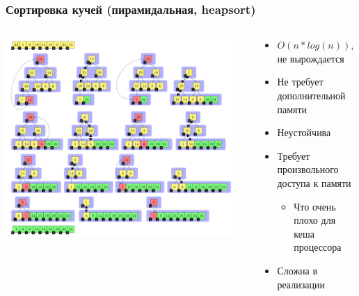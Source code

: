 \documentclass{../../slides-style}
\begin{document}
    \begin{frame}
        \frametitle{Сортировка кучей (пирамидальная, heapsort)}
        \begin{columns}
            \begin{column}{0.6\textwidth}
                \includegraphics[width=0.95\textwidth]{heapsort.png}
            \end{column}
            \begin{column}{0.4\textwidth}
                \begin{itemize}
                    \item $O(n * log(n))$, не вырождается
                    \item Не требует дополнительной памяти
                    \item Неустойчива
                    \item Требует произвольного доступа к памяти
                    \begin{itemize}
                        \item Что очень плохо для кеша процессора
                    \end{itemize}
                    \item Сложна в реализации
                \end{itemize}
            \end{column}
        \end{columns}
    \end{frame}
\end{document}
